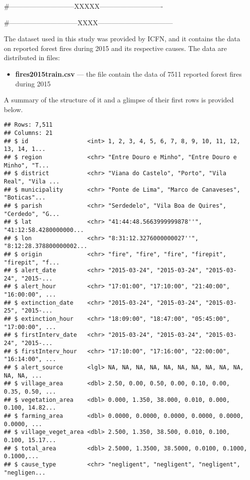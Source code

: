 \documentclass[
  12pt,
]{report}
\providecommand{\tightlist}{%
  \setlength{\itemsep}{0pt}\setlength{\parskip}{0pt}}
\begin{document}
\#-----------------------------XXXXX----------------------------

\#------------------------------XXXX---------------------------------

The dataset used in this study was provided by ICFN, and it contains the
data on reported forest fires during 2015 and its respective causes. The
data are distributed in files:

\begin{itemize}
\tightlist
\item
  \textbf{fires2015train.csv} --- the file contain the data of 7511
  reported forest fires during 2015
\end{itemize}

A summary of the structure of it and a glimpse of their first rows is
provided below.

\begin{verbatim}
## Rows: 7,511
## Columns: 21
## $ id                 <int> 1, 2, 3, 4, 5, 6, 7, 8, 9, 10, 11, 12, 13, 14, 1...
## $ region             <chr> "Entre Douro e Minho", "Entre Douro e Minho", "T...
## $ district           <chr> "Viana do Castelo", "Porto", "Vila Real", "Vila ...
## $ municipality       <chr> "Ponte de Lima", "Marco de Canaveses", "Boticas"...
## $ parish             <chr> "Serdedelo", "Vila Boa de Quires", "Cerdedo", "G...
## $ lat                <chr> "41:44:48.5663999999878''", "41:12:58.4280000000...
## $ lon                <chr> "8:31:12.3276000000027''", "8:12:28.378800000002...
## $ origin             <chr> "fire", "fire", "fire", "firepit", "firepit", "f...
## $ alert_date         <chr> "2015-03-24", "2015-03-24", "2015-03-24", "2015-...
## $ alert_hour         <chr> "17:01:00", "17:10:00", "21:40:00", "16:00:00", ...
## $ extinction_date    <chr> "2015-03-24", "2015-03-24", "2015-03-25", "2015-...
## $ extinction_hour    <chr> "18:09:00", "18:47:00", "05:45:00", "17:00:00", ...
## $ firstInterv_date   <chr> "2015-03-24", "2015-03-24", "2015-03-24", "2015-...
## $ firstInterv_hour   <chr> "17:10:00", "17:16:00", "22:00:00", "16:14:00", ...
## $ alert_source       <lgl> NA, NA, NA, NA, NA, NA, NA, NA, NA, NA, NA, NA, ...
## $ village_area       <dbl> 2.50, 0.00, 0.50, 0.00, 0.10, 0.00, 0.35, 0.50, ...
## $ vegetation_area    <dbl> 0.000, 1.350, 38.000, 0.010, 0.000, 0.100, 14.82...
## $ farming_area       <dbl> 0.0000, 0.0000, 0.0000, 0.0000, 0.0000, 0.0000, ...
## $ village_veget_area <dbl> 2.500, 1.350, 38.500, 0.010, 0.100, 0.100, 15.17...
## $ total_area         <dbl> 2.5000, 1.3500, 38.5000, 0.0100, 0.1000, 0.1000,...
## $ cause_type         <chr> "negligent", "negligent", "negligent", "negligen...
\end{verbatim}
\end{document}
